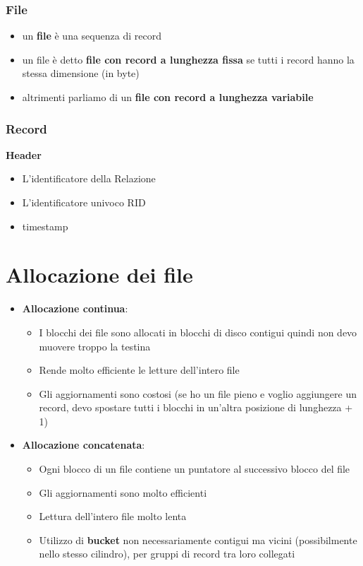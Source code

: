 \documentclass[12pt]{article}
\begin{document}
\subsubsection{File}
\begin{itemize}
    \item un \textbf{file} è una sequenza di record
    \item un file è detto \textbf{file con record a lunghezza fissa} se tutti i record hanno la stessa dimensione (in byte)
    \item altrimenti parliamo di un \textbf{file con record a lunghezza variabile}
\end{itemize}
\subsubsection{Record}
    \textbf{Header} 
    \begin{itemize}
        \item L'identificatore della Relazione
        \item L'identificatore univoco RID
        \item timestamp
    \end{itemize}
\section{Allocazione dei file}
\begin{itemize}
    \item \textbf{Allocazione continua}: \begin{itemize}
        \item I blocchi dei file sono allocati in blocchi di disco contigui quindi non devo muovere troppo la testina
        \item Rende molto efficiente le letture dell'intero file
        \item Gli aggiornamenti sono costosi (se ho un file pieno e voglio aggiungere un record, devo spostare tutti i blocchi in un'altra posizione di lunghezza + 1)
    \end{itemize}
    \item \textbf{Allocazione concatenata}: \begin{itemize}
        \item Ogni blocco di un file contiene un puntatore al successivo blocco del file
        \item Gli aggiornamenti sono molto efficienti
        \item Lettura dell'intero file  molto lenta
        \item Utilizzo di \textbf{bucket} non necessariamente contigui ma vicini (possibilmente nello stesso cilindro), per gruppi di record tra loro collegati
    \end{itemize}
\end{itemize}
\end{document}
